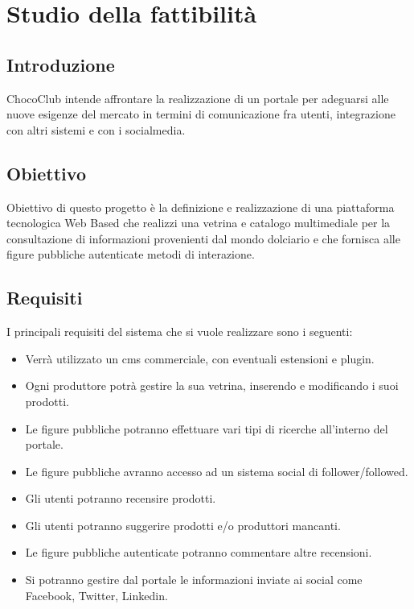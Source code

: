 \chapter{Studio della fattibilità} %
\label{cha:studio_della_fattibilita}

\section{Introduzione} 
\label{sec:realizzabilita_sistema}
ChocoClub intende affrontare la realizzazione di un portale per adeguarsi alle nuove esigenze del mercato in 
termini di comunicazione fra utenti, integrazione con altri sistemi e con i socialmedia.

\section{Obiettivo} 
\label{sec:obiettivo}
Obiettivo di questo progetto è la definizione e realizzazione di una piattaforma tecnologica Web Based
che realizzi una vetrina e catalogo multimediale per la consultazione di informazioni provenienti dal mondo dolciario e che fornisca alle figure pubbliche autenticate metodi di interazione.

\section{Requisiti} 
\label{sec:requisiti}
I principali requisiti del sistema che si vuole realizzare sono i seguenti:
\begin{itemize}
	\item Verrà utilizzato un \gls{cms} commerciale, con eventuali estensioni e plugin.

	\item Ogni produttore potrà gestire la sua vetrina, inserendo e modificando i suoi prodotti.

	\item Le figure pubbliche potranno effettuare vari tipi di ricerche all'interno del portale. 

	\item Le figure pubbliche avranno accesso ad un sistema social di follower/followed.

	\item Gli utenti potranno recensire prodotti.

	\item Gli utenti potranno suggerire prodotti e/o produttori mancanti.

	\item Le figure pubbliche autenticate potranno commentare altre recensioni.

	\item Si potranno gestire dal portale le informazioni inviate ai social come Facebook, Twitter, Linkedin.
\end{itemize}



